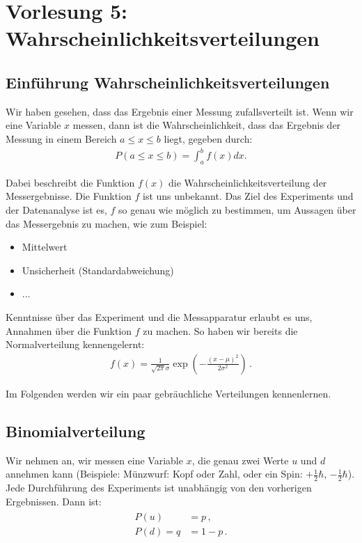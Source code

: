 \section{Vorlesung 5: Wahrscheinlichkeitsverteilungen}
\label{sec:vl5}


\subsection{Einf\"uhrung Wahrscheinlichkeitsverteilungen}
\label{subsec:vl5}

Wir haben gesehen, dass das Ergebnis einer Messung zufallsverteilt ist. Wenn wir eine Variable $x$ messen, dann ist die Wahrscheinlichkeit, dass das Ergebnis der Messung in einem Bereich $ a \leq x \leq b $ liegt, gegeben durch:
\begin{align}
P(  a \leq x \leq b ) = \int_a^b f (x) dx.
\label{eq:vl5-1}
\end{align}

Dabei beschreibt die Funktion $f (x)$ die Wahrscheinlichkeitsverteilung der Messergebnisse. Die Funktion $f$ ist uns unbekannt. Das Ziel des Experiments und der Datenanalyse ist es, $f$ so genau wie möglich zu bestimmen, um Aussagen über das Messergebnis zu machen, wie zum Beispiel:
\begin{itemize}
    \setlength\itemsep{0em}
        \item Mittelwert
        \item Unsicherheit (Standardabweichung)
        \item ...
\end{itemize}

Kenntnisse über das Experiment und die Messapparatur erlaubt es uns, Annahmen über die Funktion $f$ zu machen. So haben wir bereits die Normalverteilung kennengelernt:
\begin{align}
f (x) = \frac{ 1 }{ \sqrt{ 2 \pi } \sigma } \exp \left( - \frac{ (x - \mu)^2 }{ 2 \sigma^2} \right)\,.
\label{eq:vl5-2}
\end{align}

Im Folgenden werden wir ein paar gebräuchliche Verteilungen kennenlernen.


\subsection{Binomialverteilung}
\label{subsec:vl5-2}

Wir nehmen an, wir messen eine Variable $x$, die genau zwei Werte $u$ und $d$ annehmen kann (Beispiele: Münzwurf: Kopf oder Zahl, oder ein Spin: $+ \frac{1}{2} \hbar$, $- \frac{1}{2} \hbar$). Jede Durchführung des Experiments ist unabhängig von den vorherigen Ergebnissen. Dann ist:
\begin{align}
\begin{split}
P (u) &= p\,,\\
P (d) = q &= 1 - p \,.
\end{split}
\label{eq:vl5-3}
\end{align}

